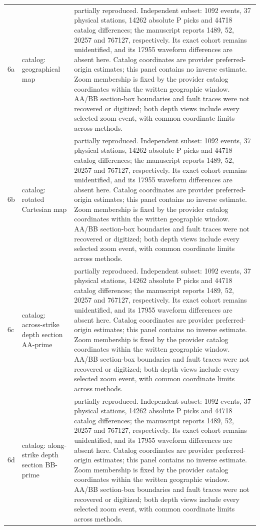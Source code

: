 \begin{longtable}{>{\raggedright\arraybackslash}p{}>{\raggedright\arraybackslash}p{}>{\raggedright\arraybackslash}p{}}
6a & catalog: geographical map & partially reproduced. Independent subset: 1092 events, 37 physical stations, 14262 absolute P picks and 44718 catalog differences; the manuscript reports 1489, 52, 20257 and 767127, respectively. Its exact cohort remains unidentified, and its 17955 waveform differences are absent here. Catalog coordinates are provider preferred-origin estimates; this panel contains no inverse estimate. Zoom membership is fixed by the provider catalog coordinates within the written geographic window. AA/BB section-box boundaries and fault traces were not recovered or digitized; both depth views include every selected zoom event, with common coordinate limits across methods.\\
6b & catalog: rotated Cartesian map & partially reproduced. Independent subset: 1092 events, 37 physical stations, 14262 absolute P picks and 44718 catalog differences; the manuscript reports 1489, 52, 20257 and 767127, respectively. Its exact cohort remains unidentified, and its 17955 waveform differences are absent here. Catalog coordinates are provider preferred-origin estimates; this panel contains no inverse estimate. Zoom membership is fixed by the provider catalog coordinates within the written geographic window. AA/BB section-box boundaries and fault traces were not recovered or digitized; both depth views include every selected zoom event, with common coordinate limits across methods.\\
6c & catalog: across-strike depth section AA-prime & partially reproduced. Independent subset: 1092 events, 37 physical stations, 14262 absolute P picks and 44718 catalog differences; the manuscript reports 1489, 52, 20257 and 767127, respectively. Its exact cohort remains unidentified, and its 17955 waveform differences are absent here. Catalog coordinates are provider preferred-origin estimates; this panel contains no inverse estimate. Zoom membership is fixed by the provider catalog coordinates within the written geographic window. AA/BB section-box boundaries and fault traces were not recovered or digitized; both depth views include every selected zoom event, with common coordinate limits across methods.\\
6d & catalog: along-strike depth section BB-prime & partially reproduced. Independent subset: 1092 events, 37 physical stations, 14262 absolute P picks and 44718 catalog differences; the manuscript reports 1489, 52, 20257 and 767127, respectively. Its exact cohort remains unidentified, and its 17955 waveform differences are absent here. Catalog coordinates are provider preferred-origin estimates; this panel contains no inverse estimate. Zoom membership is fixed by the provider catalog coordinates within the written geographic window. AA/BB section-box boundaries and fault traces were not recovered or digitized; both depth views include every selected zoom event, with common coordinate limits across methods.\\

\end{longtable}
